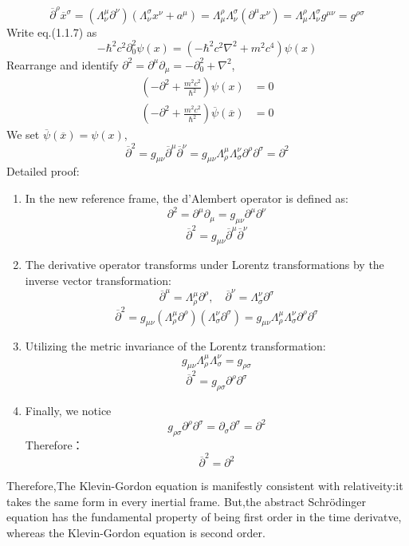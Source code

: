 \documentclass[12pt,a4paper]{article}
\numberwithin{equation}{subsection}
\begin{document}
\begin{equation}
\overline{\partial}^\rho\overline{x}^\sigma=(\Lambda^\mu_\nu\partial^\nu)(\Lambda^\sigma_\nu x^\nu+a^\mu)=\Lambda^\rho_\mu\Lambda^\sigma_\nu(\partial^\mu x^\nu)=\Lambda^\rho_\mu\Lambda^\sigma_\nu g^{\mu\nu}=g^{\rho\sigma}
\end{equation}
Write eq.(1.1.7) as 
\begin{equation}
-\hbar^2c^2\partial^2_0\psi(x)=(-\hbar^2c^2\nabla^2+m^2c^4)\psi(x)
\end{equation}
Rearrange and identify $\partial^2=\partial^\mu\partial_\mu=-\partial^2_0+\nabla^2$,
\begin{align}
(-\partial^2+\frac{m^2c^2}{\hbar^2})\psi(x)&=0\\
(-\partial^2+\frac{m^2c^2}{\hbar^2})\overline{\psi}(\overline{x}) &=0
\end{align}
We set $\overline{\psi}(\overline{x})=\psi(x)$,
\begin{equation}
\overline{\partial}^2=g_{\mu\nu}\overline{\partial}^\mu\overline{\partial}^\nu=g_{\mu\nu}\Lambda^\mu_\rho\Lambda^\nu_\sigma\partial^\rho\partial^\sigma=\partial^2
\end{equation}
Detailed proof:
\begin{enumerate}
    \item In the new reference frame, the d'Alembert operator is defined as:
    \[\partial^2=\partial^\mu\partial_\mu=g_{\mu\nu}\partial^\mu\partial^\nu
    \]
    \[
    \overline{\partial}^2 = g_{\mu\nu} \overline{\partial}^\mu \overline{\partial}^\nu
    \]

    \item The derivative operator transforms under Lorentz transformations by the inverse vector transformation:
    \[
    \overline{\partial}^\mu = \Lambda^\mu_\rho \partial^\rho, \quad 
    \overline{\partial}^\nu = \Lambda^\nu_\sigma \partial^\sigma
    \]
    \[
    \overline{\partial}^2 = g_{\mu\nu} (\Lambda^\mu_\rho \partial^\rho) (\Lambda^\nu_\sigma \partial^\sigma) 
    = g_{\mu\nu} \Lambda^\mu_\rho \Lambda^\nu_\sigma \partial^\rho \partial^\sigma
    \]

    \item Utilizing the metric invariance of the Lorentz transformation:
    \[
    g_{\mu\nu} \Lambda^\mu_\rho \Lambda^\nu_\sigma = g_{\rho\sigma}
    \]
    \[
    \overline{\partial}^2 = g_{\rho\sigma} \partial^\rho \partial^\sigma
    \]

    \item Finally, we notice
    \[
    g_{\rho\sigma} \partial^\rho \partial^\sigma = \partial_\sigma \partial^\sigma = \partial^2
    \]
    Therefore：
    \[
    \overline{\partial}^2 = \partial^2
    \]
\end{enumerate}
Therefore,The Klevin-Gordon equation is manifestly consistent with relativeity:it takes the same form in every inertial frame.
But,the abstract Schrödinger equation has the fundamental property of being first order in the time derivatve, whereas the Klevin-Gordon
equation is second order.
\end{document}
